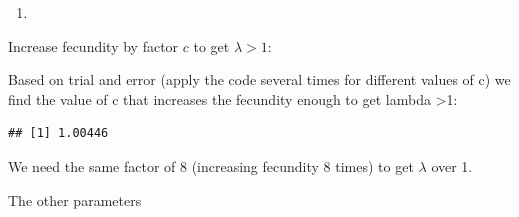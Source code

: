 \documentclass[
]{book}
\newenvironment{Shaded}{\begin{snugshade}}{\end{snugshade}}
\newcommand{\AttributeTok}[1]{\textcolor[rgb]{0.77,0.63,0.00}{#1}}
\newcommand{\CommentTok}[1]{\textcolor[rgb]{0.56,0.35,0.01}{\textit{#1}}}
\newcommand{\DecValTok}[1]{\textcolor[rgb]{0.00,0.00,0.81}{#1}}
\newcommand{\FunctionTok}[1]{\textcolor[rgb]{0.00,0.00,0.00}{#1}}
\newcommand{\NormalTok}[1]{#1}
\newcommand{\OtherTok}[1]{\textcolor[rgb]{0.56,0.35,0.01}{#1}}
\newcommand{\SpecialCharTok}[1]{\textcolor[rgb]{0.00,0.00,0.00}{#1}}
\providecommand{\tightlist}{%
  \setlength{\itemsep}{0pt}\setlength{\parskip}{0pt}}
\begin{document}
\begin{enumerate}
\def\labelenumi{\arabic{enumi}.}
\setcounter{enumi}{6}
\tightlist
\item
\end{enumerate}

Increase fecundity by factor \(c\) to get \(\lambda>1\):

Based on trial and error (apply the code several times for different values of c) we find the value of c that increases the fecundity enough to get lambda \textgreater1:

\begin{Shaded}
\end{Shaded}

\begin{verbatim}
## [1] 1.00446
\end{verbatim}

We need the same factor of 8 (increasing fecundity 8 times) to get \(\lambda\) over 1.

The other parameters
\end{document}
